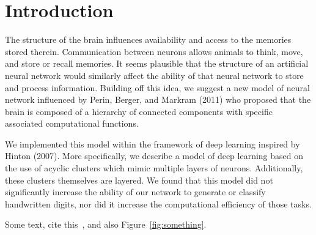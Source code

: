 \section{Introduction}
The structure of the brain influences availability and access to the memories stored therein. Communication between neurons allows animals to think, move, and store or recall memories. It seems plausible that the structure of an artificial neural network would similarly affect the ability of that neural network to store and process information. Building off this idea, we suggest a new model of neural network influenced by Perin, Berger, and Markram (2011) who proposed that the brain is composed of a hierarchy of connected components with specific associated computational functions. 

We implemented this model within the framework of deep learning inspired by Hinton (2007).  More specifically, we describe a model of deep learning based on the use of acyclic clusters which mimic multiple layers of neurons. Additionally, these clusters themselves are layered. We found that this model did not significantly increase the ability of our network to generate or classify handwritten digits, nor did it increase the computational efficiency of those tasks.

Some text, cite this~\cite{ASBMI,Acharya07}, and also Figure~\ref{fig:something}.